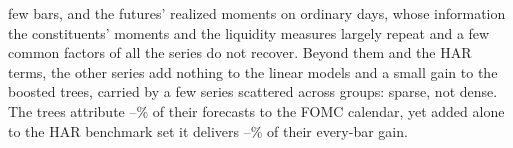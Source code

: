 \begin{itemize}
  few bars, and the futures' realized moments on ordinary days, whose information the constituents' moments and the
  liquidity measures largely repeat and a few common factors of all the series do not recover. Beyond them and the HAR
  terms, the other \rhbyFLNSeries{} series add nothing to the linear models and a small gain to the boosted trees,
  carried by a few series scattered across groups: sparse, not dense. The trees attribute
  \rhfipFomcBucketMin--\rhfipFomcBucketMax\% of their forecasts to the FOMC calendar, yet added alone to the HAR
  benchmark set it delivers \rhabTreeFomcGainShareMin--\rhabTreeFomcGainShareMax\% of their every-bar gain.
\end{itemize}
